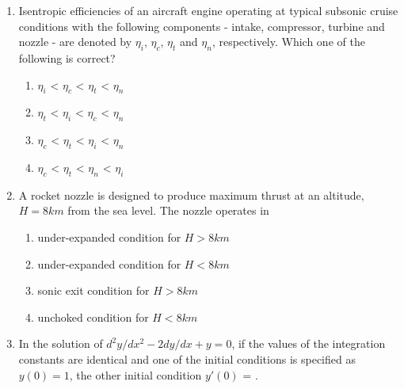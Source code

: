 \documentclass{article}
\begin{document}
\begin{enumerate}
\begin{multicols}{4}
\begin{enumerate}
\item $\delta \propto \sqrt{Re}$
\item $\delta \propto 1/\sqrt{Re}$
\item $\delta \propto Re$
\item $\delta \propto 1/Re$
\end{enumerate}
\end{multicols}

\item Isentropic efficiencies of an aircraft engine operating at typical subsonic cruise conditions with the following components - intake, compressor, turbine and nozzle - are denoted by $\eta_i$, $\eta_c$, $\eta_t$ and $\eta_n$, respectively. Which one of the following is correct?

\begin{multicols}{4}
\begin{enumerate}
\item $\eta_i$ < $\eta_c$ < $\eta_t$ < $\eta_n$
\item $\eta_t$ < $\eta_i$ < $\eta_c$ < $\eta_n$
\item $\eta_c$ < $\eta_t$ < $\eta_i$ < $\eta_n$
\item $\eta_c$ < $\eta_t$ < $\eta_n$ < $\eta_i$
\end{enumerate}
\end{multicols}

\item A rocket nozzle is designed to produce maximum thrust at an altitude, $H = 8 km$ from the sea level. The nozzle operates in

\begin{enumerate}
\item under-expanded condition for $H > 8 km$
\item under-expanded condition for $H < 8 km$
\item sonic exit condition for $H > 8 km$
\item unchoked condition for $H < 8 km$
\end{enumerate}

\item In the solution of $d^2y/dx^2 - 2dy/dx + y = 0$, if the values of the integration constants are identical and one of the initial conditions is specified as $y(0) = 1$, the other initial condition $y'(0)$ = \underline{\hspace{2cm}}.



\end{enumerate}
\end{document}

